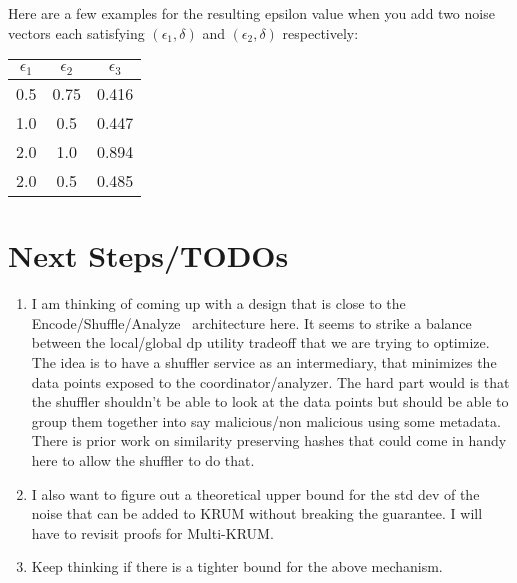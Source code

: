 \documentclass{article}
\theoremstyle{remark}
\theoremstyle{definition}
\begin{document}
Here are a few examples for the resulting epsilon value  when you add two noise vectors each satisfying $(\epsilon_{1},\delta)$ and $(\epsilon_{2},\delta)$ respectively:

	\begin{center}
	 \begin{tabular}{||c c c||} 
	 \hline
	 $\epsilon_{1}$ & $\epsilon_{2}$ & $\epsilon_{3}$ \\  
	 \hline\hline
	 0.5 & 0.75 & 0.416 \\
	 \hline
	 1.0 & 0.5 & 0.447 \\
	 \hline
	 2.0 & 1.0 & 0.894 \\
	 \hline
	 2.0 & 0.5 & 0.485 \\
	\end{tabular}
	\end{center}






\section{Next Steps/TODOs}
\begin{enumerate}
	\item{I am thinking of coming up with a design that is close to the Encode/Shuffle/Analyze~\cite{Bittau:2017} architecture here. It seems to strike a balance between the local/global dp utility tradeoff that we are trying to optimize. The idea is to have a shuffler service as an intermediary, that minimizes the data points exposed to the coordinator/analyzer. The hard part would is that the shuffler shouldn't be able to look at the data points but should be able to group them together into say malicious/non malicious using some metadata. There is prior work on similarity preserving hashes that could come in handy here to allow the shuffler to do that. }
	\item{I also want to figure out a theoretical upper bound for the std dev of the noise that can be added to KRUM without breaking the guarantee. I will have to revisit proofs for Multi-KRUM.}
	\item{Keep thinking if there is a tighter bound for the above mechanism.}
\end{enumerate}
\end{document}

